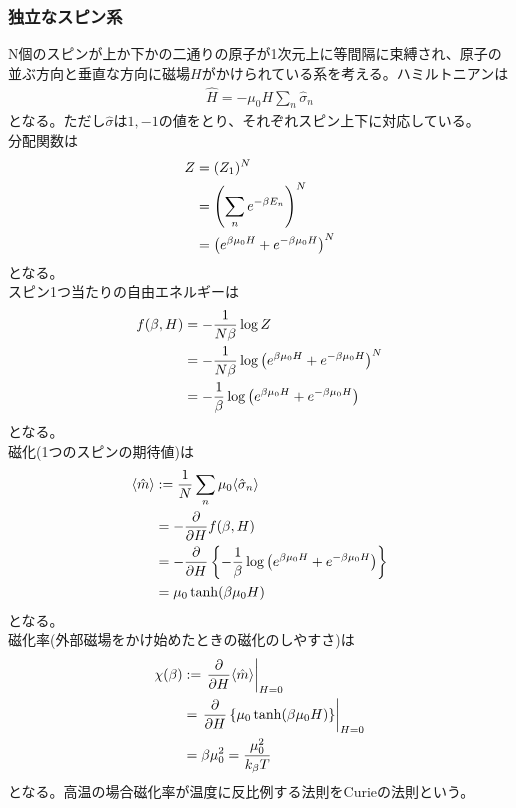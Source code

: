 \documentclass[dvipdfmx, 11pt, a4paper]{jsarticle}
\theoremstyle{definition}
\begin{document}
\subsubsection{独立なスピン系}
    N個のスピンが上か下かの二通りの原子が1次元上に等間隔に束縛され、原子の並ぶ方向と垂直な方向に磁場$H$がかけられている系を考える。ハミルトニアンは
    \begin{align}
        \hat{H} = - \mu_0 H \sum_n \hat{\sigma}_n
    \end{align}
    となる。ただし$\hat{\sigma}$は$1,-1$の値をとり、それぞれスピン上下に対応している。\\
    分配関数は
    \begin{align}
        Z &= (Z_1)^N \\
        &= \left( \sum_n e^{-\beta E_n} \right)^N \notag \\
        &= \left( e^{\beta \mu_0 H} + e^{-\beta \mu_0 H} \right)^N \notag 
    \end{align}
    となる。\\
    スピン1つ当たりの自由エネルギーは
    \begin{align}
        f(\beta,H) &= -\frac{1}{N\beta} \log Z \notag \\
        &= -\frac{1}{N\beta} \log \left( e^{\beta \mu_0 H} + e^{-\beta \mu_0 H} \right)^N \notag \\
        &= -\frac{1}{\beta} \log \left( e^{\beta \mu_0 H} + e^{-\beta \mu_0 H} \right) 
    \end{align}
    となる。\\
    磁化(1つのスピンの期待値)は
    \begin{align}
        \langle \hat{m} \rangle &:= \frac{1}{N} \sum_n \mu_0 \langle \hat{\sigma}_n \rangle \notag \\
        &= - \frac{\partial }{\partial H} f(\beta,H) \notag \\
        &= -\frac{\partial}{\partial H} \left\{ -\frac{1}{\beta} \log \left( e^{\beta \mu_0 H} + e^{-\beta \mu_0 H} \right)  \right\} \notag \\
        &= \mu_0 \tanh (\beta \mu_0 H)
    \end{align}
    となる。\\
    磁化率(外部磁場をかけ始めたときの磁化のしやすさ)は
    \begin{align}
        \chi(\beta) &:= \left. \frac{\partial }{\partial H } \langle \hat{m} \rangle \right|_{H=0} \notag \\
        &= \left. \frac{\partial }{\partial H } \left\{ \mu_0 \tanh (\beta \mu_0 H) \right\} \right|_{H=0} \notag \\
        &= \beta \mu_0^2 =\frac{\mu_0^2}{k_\beta T}
    \end{align}
    となる。高温の場合磁化率が温度に反比例する法則をCurieの法則という。
\end{document}
